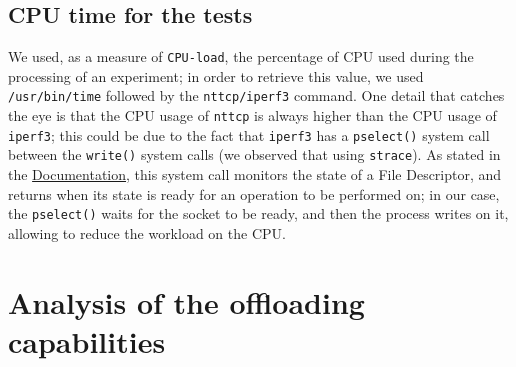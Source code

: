 \documentclass{exam}
\begin{document}
\subsection{CPU time for the tests}
We used, as a measure of \verb|CPU-load|, the percentage of CPU used during the processing of an experiment; in order to retrieve this value, we used \verb|/usr/bin/time| followed by the \texttt{nttcp/iperf3} command. One detail that catches the eye is that the CPU usage of \texttt{nttcp} is always higher than the CPU usage of \texttt{iperf3}; this could be due to the fact that \texttt{iperf3} has a \texttt{pselect()} system call between the \texttt{write()} system calls (we observed that using \texttt{strace}). As stated in the \href{https://linux.die.net/man/2/pselect}{Documentation}, this system call monitors the state of a File Descriptor, and returns when its state is ready for an operation to be performed on; in our case, the \texttt{pselect()} waits for the socket to be ready, and then the process writes on it, allowing to reduce the workload on the CPU.

\section{Analysis of the offloading capabilities}
\end{document}
